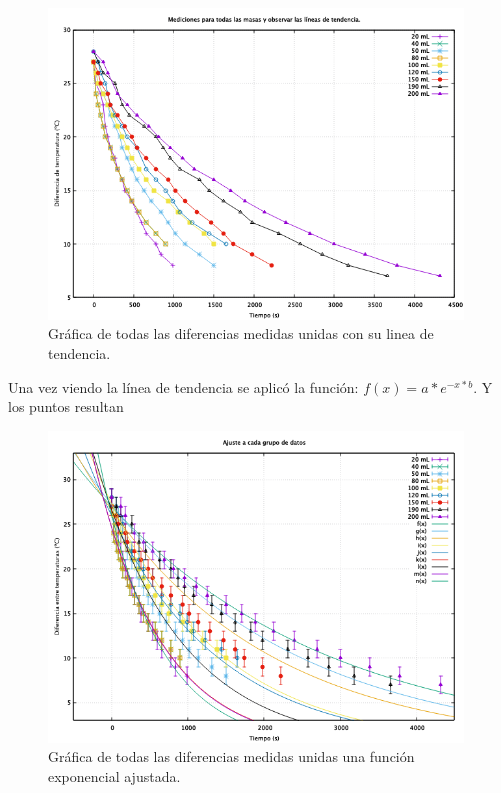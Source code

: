 \documentclass[a4paper]{article}
\begin{document}
\begin{figure}[H]
    \centering
    \includegraphics[width=11cm]{Todos.png}%
    \caption{Gráfica de todas las diferencias medidas unidas con su linea de tendencia.}%
\end{figure}

Una vez viendo la línea de tendencia se aplicó la función: $f(x) = a*e^{-x*b}$. Y los puntos resultan

\begin{figure}[H]
    \centering
    \includegraphics[width=11cm]{TODASALV.png}%
    \caption{Gráfica de todas las diferencias medidas unidas una función exponencial ajustada.}%
\end{figure}
\end{document}
